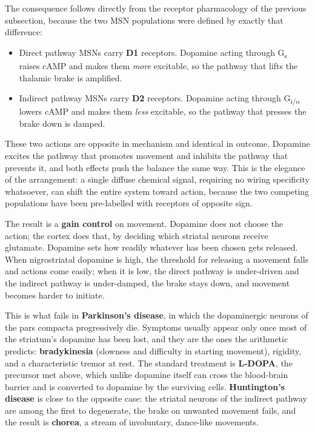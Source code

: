 \documentclass[11pt]{article}
\begin{document}
The consequence follows directly from the receptor pharmacology of the previous subsection, because the two MSN populations were defined by exactly that difference:

\begin{itemize}
    \item Direct pathway MSNs carry \textbf{D1} receptors. Dopamine acting through G\textsubscript{s} raises cAMP and makes them \textit{more} excitable, so the pathway that lifts the thalamic brake is amplified.
    \item Indirect pathway MSNs carry \textbf{D2} receptors. Dopamine acting through G\textsubscript{i/o} lowers cAMP and makes them \textit{less} excitable, so the pathway that presses the brake down is damped.
\end{itemize}

These two actions are opposite in mechanism and identical in outcome. Dopamine excites the pathway that promotes movement and inhibits the pathway that prevents it, and both effects push the balance the same way. This is the elegance of the arrangement: a single diffuse chemical signal, requiring no wiring specificity whatsoever, can shift the entire system toward action, because the two competing populations have been pre-labelled with receptors of opposite sign.

The result is a \textbf{gain control} on movement. Dopamine does not choose the action; the cortex does that, by deciding which striatal neurons receive glutamate. Dopamine sets how readily whatever has been chosen gets released. When nigrostriatal dopamine is high, the threshold for releasing a movement falls and actions come easily; when it is low, the direct pathway is under-driven and the indirect pathway is under-damped, the brake stays down, and movement becomes harder to initiate.

This is what fails in \textbf{Parkinson's disease}, in which the dopaminergic neurons of the pars compacta progressively die. Symptoms usually appear only once most of the striatum's dopamine has been lost, and they are the ones the arithmetic predicts: \textbf{bradykinesia} (slowness and difficulty in starting movement), rigidity, and a characteristic tremor at rest. The standard treatment is \textbf{L-DOPA}, the precursor met above, which unlike dopamine itself can cross the blood-brain barrier and is converted to dopamine by the surviving cells. \textbf{Huntington's disease} is close to the opposite case: the striatal neurons of the indirect pathway are among the first to degenerate, the brake on unwanted movement fails, and the result is \textbf{chorea}, a stream of involuntary, dance-like movements.
\end{document}
